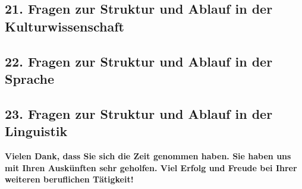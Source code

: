 \documentclass[a4paper,10pt]{article}
\begin{document}
{

\pagebreak


\subsection*{21. Fragen zur Struktur und Ablauf in der Kulturwissenschaft}



\pagebreak


\subsection*{22. Fragen zur Struktur und Ablauf in der Sprache}



\pagebreak


\subsection*{23. Fragen zur Struktur und Ablauf in der Linguistik}



\bigskip

\begin{flushleft}
\textbf{Vielen Dank, dass Sie sich die Zeit genommen haben. Sie haben uns mit Ihren Auskünften sehr geholfen. Viel Erfolg und Freude bei Ihrer weiteren beruflichen Tätigkeit!}
\end{flushleft}


}
\end{document}
